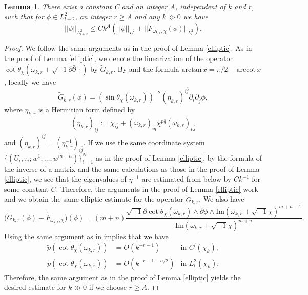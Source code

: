 \documentclass{amsart}
\numberwithin{equation}{section}
\theoremstyle{plain}
\newtheorem{lemma}[equation]{Lemma}
\theoremstyle{definition}
\theoremstyle{remark}
\begin{document}
\begin{lemma}
    There exist a constant C and an integer $A$, independent of $k$ and $r$, such that for $\phi \in L^2_{l+2}$, an integer $r \ge A$ and any $k \gg 0$ we have
    $$ ||\phi||_{L^2_{l+2}} \le C k^A\left( ||\phi||_{L^2} + ||\tilde{F}_{\omega_{k,r}, \chi}(\phi)||_{L^2_l} \right).$$
\end{lemma}

\begin{proof}
    We follow the same arguments as in the proof of Lemma \ref{elliptic}. As in the proof of Lemma \ref{elliptic}, we denote the linearization of the operator $\cot\theta_\chi(\omega_{k,r}+\sqrt{-1}\partial\bar{\partial}\, \cdot)$ by $\tilde{G}_{k,r}$. By \cite[Lemma 3.3]{JY} and the formula $\mathrm{arctan} \, x=\pi/2-\mathrm{arccot}\, x$, locally we have 
    \begin{equation}\label{eq:dhymlin}
        \tilde{G}_{k,r}(\phi)=(\sin\theta_\chi(\omega_{k,r}))^{-2}(\eta_{k,r})^{i\bar{j}}\partial_i\partial_{\bar{j}}\phi,
    \end{equation}
    where $\eta_{k,r}$ is a Hermitian form defined by 
    \begin{equation}\label{eq:eta}
        (\eta_{k,r})_{i\bar{j}}:=\chi_{i\bar{j}}+(\omega_{k,r})_{i\bar{q}}\chi^{p\bar{q}}(\omega_{k,r})_{p\bar{j}}
    \end{equation}
    and $(\eta_{k,r})^{i\bar{j}}=(\eta_{k,r}^{-1})_{i\bar{j}}$. 
    If we use the same coordinate system $\{ (U_i, \tau_i; w^1,\dots, w^{m+n}) \}^N_{i=1}$ as in the proof of Lemma \ref{elliptic}, by the formula of the inverse of a matrix and the same calculations as those in the proof of Lemma \ref{elliptic}, we see that the eigenvalues  of $\eta^{-1}$ are estimated from below by $Ck^{-1}$ for some constant $C$. Therefore, the arguments in the proof of Lemma \ref{elliptic} work and we obtain the same elliptic estimate for the operator $\tilde{G}_{k,r}$.  We also have
    $$\Big(\tilde{G}_{k,r}(\phi)-\tilde{F}_{\omega_{k,r},\chi}\Big)(\phi)=(m+n)\frac{\sqrt{-1}\partial\cot\theta_\chi(\omega_{k,r})\wedge\bar{\partial}\phi\wedge\mathrm{Im}(\omega_{k,r}+\sqrt{-1}\chi)^{m+n-1}}{\mathrm{Im}(\omega_{k,r}+\sqrt{-1}\chi)^{m+n}}.$$
 Using the same argument as in \cite[Lemma 5.7]{Fine} implies that we have
    \begin{align*}
    \tilde{p}(\cot\theta_\chi(\omega_{k,r}))&= O(k^{-r-1}) &\text{in $C^l(\chi_k)$},\\
    \tilde{p}(\cot\theta_\chi(\omega_{k,r}))&= O(k^{-r-1-n/2}) &\text{in $L^2_l(\chi_k)$}.
    \end{align*}
    Therefore, the same argument as in the proof of Lemma \ref{elliptic} yields the desired estimate for $k\gg0$ if we choose $r\ge A$.
\end{proof}
\end{document}
